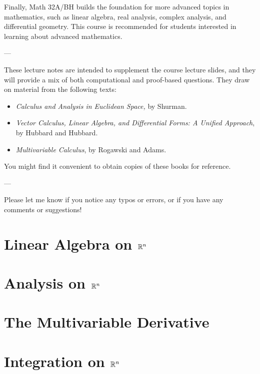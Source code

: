\documentclass{wongtreebook}
\begin{document}
Finally, Math 32A/BH builds the foundation for more advanced topics in mathematics, such as linear algebra, real analysis, complex analysis, and differential geometry.  This course is recommended for students interested in learning about advanced mathematics. 

\begin{center}
    ---
\end{center}

These lecture notes are intended to supplement the course lecture slides, and they will provide a mix of both computational and proof-based questions.  They draw on material from the following texts:
\begin{itemize}
    \item \textit{Calculus and Analysis in Euclidean Space,} by Shurman.
    \item \textit{Vector Calculus, Linear Algebra, and Differential Forms: A Unified Approach}, by Hubbard and Hubbard.
    \item \textit{Multivariable Calculus}, by Rogawski and Adams.
\end{itemize}

You might find it convenient to obtain copies of these books for reference.

\begin{center}
    ---
\end{center}

Please let me know if you notice any typos or errors, or if you have any comments or suggestions!

 
\afterpreface


\chapter{Linear Algebra on $\mathbb{R}^n$}


\chapter{Analysis on $\mathbb{R}^n$}


\chapter{The Multivariable Derivative}




\chapter{Integration on $\mathbb{R}^n$}
\end{document}
